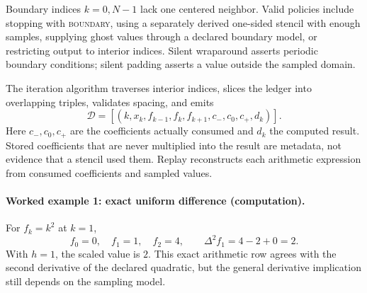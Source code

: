 Boundary indices \(k=0,N-1\) lack one centered neighbor.  Valid policies include stopping with
\textsc{boundary}, using a separately derived one-sided stencil with enough samples, supplying ghost values through
a declared boundary model, or restricting output to interior indices.  Silent wraparound asserts periodic boundary
conditions; silent padding asserts a value outside the sampled domain.

The iteration algorithm traverses interior indices, slices the ledger into overlapping triples, validates spacing,
and emits
\[
\mathcal D=[(k,x_k,f_{k-1},f_k,f_{k+1},c_-,c_0,c_+,d_k)].
\]
Here \(c_-,c_0,c_+\) are the coefficients actually consumed and \(d_k\) the computed result.  Stored coefficients that
are never multiplied into the result are metadata, not evidence that a stencil used them.  Replay reconstructs each
arithmetic expression from consumed coefficients and sampled values.

\paragraph{Worked example 1: exact uniform difference (computation).}
For \(f_k=k^2\) at \(k=1\),
\[
                         f_0=0,\quad f_1=1,\quad f_2=4,\qquad
                         \Delta^2f_1=4-2+0=2.
\]
With \(h=1\), the scaled value is \(2\).  This exact arithmetic row agrees with the second derivative of the declared
quadratic, but the general derivative implication still depends on the sampling model.

